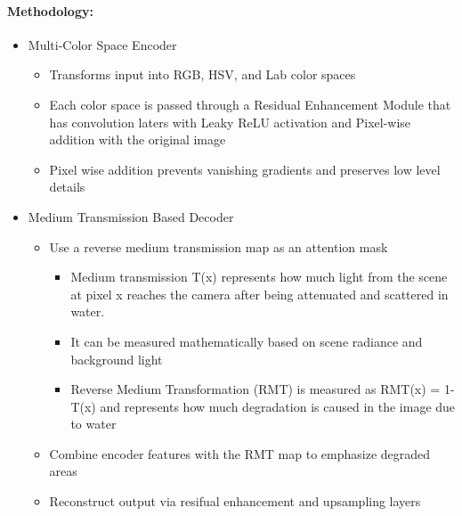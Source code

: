 \documentclass{article}
\begin{document}
\paragraph{Methodology:}
\begin{itemize}
    \item Multi-Color Space Encoder
          \begin{itemize}
              \item Transforms input into RGB, HSV, and Lab color spaces
              \item Each color space is passed through a Residual Enhancement Module that has convolution laters with Leaky ReLU activation and Pixel-wise addition with the original image
              \item Pixel wise addition prevents vanishing gradients and preserves low level details
          \end{itemize}

    \item Medium Transmission Based Decoder
          \begin{itemize}
              \item Use a reverse medium transmission map as an attention mask
                    \begin{itemize}
                        \item Medium transmission T(x) represents how much light from the scene at pixel x reaches the camera after being attenuated and scattered in water.
                        \item It can be measured mathematically based on scene radiance and background light
                        \item Reverse Medium Transformation (RMT) is measured as RMT(x) = 1-T(x) and represents how much degradation is caused in the image due to water
                    \end{itemize}
              \item Combine encoder features with the RMT map to emphasize degraded areas
              \item Reconstruct output via resifual enhancement and upsampling layers
          \end{itemize}
\end{itemize}
\end{document}
